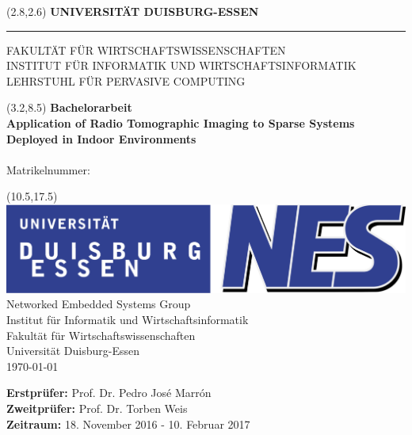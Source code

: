 \begin{titlepage}
\vspace*{-1cm}
\newlength{\links}
\setlength{\links}{0.9cm}
\setlength{\TPHorizModule}{1cm}
\setlength{\TPVertModule}{1cm}
\textblockorigin{0pt}{0pt}

\sf
\LARGE

\begin{textblock}{16.5}(2.8,2.6)
 \hspace*{-0.25cm} \textbf{UNIVERSITÄT DUISBURG-ESSEN} \\
 \hspace*{-1.15cm} \rule{5mm}{5mm} \hspace*{0.05cm} FAKULTÄT FÜR WIRTSCHAFTSWISSENSCHAFTEN\\
 \large{}INSTITUT FÜR INFORMATIK UND WIRTSCHAFTSINFORMATIK \\
 \large{}LEHRSTUHL FÜR PERVASIVE COMPUTING\\
\end{textblock}


\begin{textblock}{14.5}(3.2,8.5)
  \large
{ \bf Bachelorarbeit} \\[1cm]
{\LARGE \Large\bf Application of Radio Tomographic Imaging to Sparse Systems Deployed in Indoor Environments} \\[1.3cm]
\studentFirsName { } \studentSecondName\\
Matrikelnummer: \studentMatrikelnummer
\end{textblock}



\begin{textblock}{10}(10.5,17.5)
\includegraphics[scale=0.23	]{content/images/NES_Logo.pdf}\\
\normalsize
\raggedleft
Networked Embedded Systems Group \\
Institut für Informatik und Wirtschaftsinformatik \\
Fakultät für Wirtschaftswissenschaften \\
Universität Duisburg-Essen \\[2ex]

\today\\[15ex]
\raggedright
{\bf Erstprüfer:} Prof. Dr. Pedro José Marrón \\
{\bf Zweitprüfer:} Prof. Dr. Torben Weis \\
{\bf Zeitraum:} 18. November 2016 - 10. Februar 2017\\
\end{textblock}


\end{titlepage}
